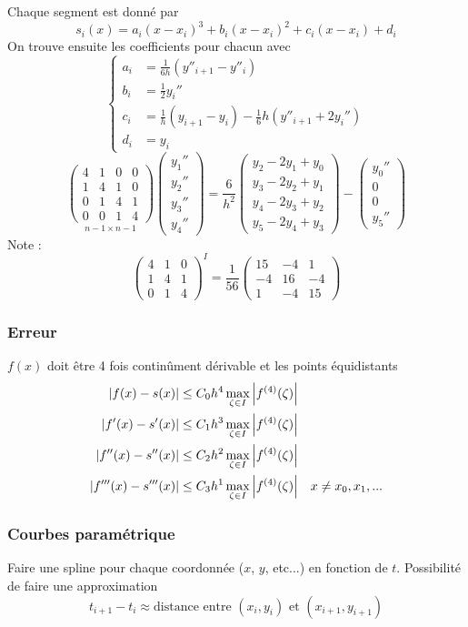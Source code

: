\documentclass[resume]{subfiles}
\begin{document}
    Chaque segment est donné par
    $$\boxed{s_i(x)=a_i(x-x_i)^3+b_i(x-x_i)^2+c_i(x-x_i)+d_i}$$
    On trouve ensuite les coefficients pour chacun avec
	$$\begin{cases}
	a_i &= \frac{1}{6h}\left(y''_{i+1}-y''_{i}\right)\\
	b_i &= \frac{1}{2}y_i''\\
	c_i &= \frac{1}{h}\left(y_{i+1}-y_i\right)-\frac{1}{6}h\left(y''_{i+1}+2y_{i}''\right)\\
	d_i &= y_i
	\end{cases}$$
	$$\underset{n-1\times n-1}{\begin{pmatrix}
4 & 1 & 0 & 0\\
1 & 4 & 1 & 0\\
0 & 1 & 4 & 1\\
0 & 0 & 1 & 4
\end{pmatrix}}\begin{pmatrix}
y_1''\\
y_2''\\
y_3''\\
y_4''
\end{pmatrix}=\frac{6}{h^2}\begin{pmatrix}
y_2-2y_1+y_0\\
y_3-2y_2+y_1\\
y_4-2y_3+y_2\\
y_5-2y_4+y_3
\end{pmatrix}-\begin{pmatrix}
y_0''\\
0\\
0\\
y_5''
\end{pmatrix}$$
Note :
$$\begin{pmatrix}
4 & 1 & 0\\
1 & 4 & 1\\
0 & 1 & 4
\end{pmatrix}^{I}=\frac{1}{56}\begin{pmatrix}
15 & -4 & 1\\
-4 & 16 & -4\\
1 & -4 & 15
\end{pmatrix}$$
\subsubsection{Erreur}
$f(x)$ doit être 4 fois continûment dérivable et les points équidistants
\begin{align*}
\abs{f(x)-s(x)}&\leq C_0h^4\max_{\zeta\in I}\abs{f^{(4)}(\zeta)}\\
\abs{f'(x)-s'(x)}&\leq C_1h^3\max_{\zeta\in I}\abs{f^{(4)}(\zeta)}\\
\abs{f''(x)-s''(x)}&\leq C_2h^2\max_{\zeta\in I}\abs{f^{(4)}(\zeta)}\\
\abs{f'''(x)-s'''(x)}&\leq C_3h^1\max_{\zeta\in I}\abs{f^{(4)}(\zeta)} & x\neq x_0,x_1,...
\end{align*}
\subsubsection{Courbes paramétrique}
Faire une spline pour chaque coordonnée ($x$, $y$, etc...) en fonction de $t$. Possibilité de faire une approximation
$$t_{i+1}-t_{i}\approx \text{distance entre } (x_i,y_i)\text{ et } (x_{i+1},y_{i+1})$$

    
\end{document}
